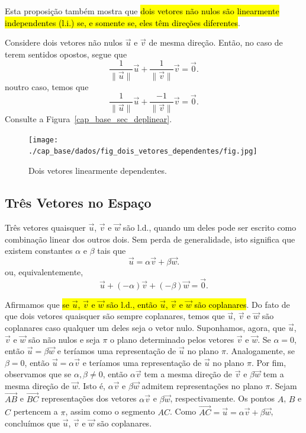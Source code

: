 Esta proposição também mostra que \hl{dois vetores não nulos são linearmente independentes (l.i.) se, e somente se, eles têm direções diferentes}.

\begin{ex}
  Considere dois vetores não nulos $\vec{u}$ e $\vec{v}$ de mesma direção. Então, no caso de terem sentidos opostos, segue que
  \begin{equation}
    \frac{1}{\|\vec{u}\|}\vec{u} + \frac{1}{\|\vec{v}\|}\vec{v} = \vec{0}.
  \end{equation}
  noutro caso, temos que
  \begin{equation}
    \frac{1}{\|\vec{u}\|}\vec{u} + \frac{-1}{\|\vec{v}\|}\vec{v} = \vec{0}.
  \end{equation}
  Consulte a Figura~\ref{cap_base_sec_deplinear}.

  \begin{figure}[h]
    \centering
    \texttt{[image: ./cap\_base/dados/fig\_dois\_vetores\_dependentes/fig.jpg]}
    \caption{Dois vetores linearmente dependentes.}
  \end{figure}
\end{ex}

\subsection{Três Vetores no Espaço}\label{cap_base_sec_deplinear_ssec_3vec}

Três vetores quaisquer $\vec{u}$, $\vec{v}$ e $\vec{w}$ são l.d., quando um deles pode ser escrito como combinação linear dos outros dois. Sem perda de generalidade, isto significa que existem constantes $\alpha$ e $\beta$ tais que
\begin{equation}
  \vec{u} = \alpha\vec{v} + \beta\vec{w}.
\end{equation}
ou, equivalentemente,
\begin{equation}
  \vec{u} + (-\alpha)\vec{v} + (-\beta)\vec{w} = \vec{0}.
\end{equation}

Afirmamos que \hl{se $\vec{u}$, $\vec{v}$ e $\vec{w}$ são l.d., então $\vec{u}$, $\vec{v}$ e $\vec{w}$ são coplanares}. Do fato de que dois vetores quaisquer são sempre coplanares, temos que $\vec{u}$, $\vec{v}$ e $\vec{w}$ são coplanares caso qualquer um deles seja o vetor nulo. Suponhamos, agora, que $\vec{u}$, $\vec{v}$ e $\vec{w}$ são não nulos e seja $\pi$ o plano determinado pelos vetores $\vec{v}$ e $\vec{w}$. Se $\alpha = 0$, então $\vec{u} = \beta\vec{w}$ e teríamos uma representação de $\vec{u}$ no plano $\pi$. Analogamente, se $\beta=0$, então $\vec{u} = \alpha\vec{v}$ e teríamos uma representação de $\vec{u}$ no plano $\pi$. Por fim, observamos que se $\alpha,\beta\neq 0$, então $\alpha\vec{v}$ tem a mesma direção de $\vec{v}$ e $\beta\vec{w}$ tem a mesma direção de $\vec{w}$. Isto é, $\alpha\vec{v}$ e $\beta\vec{w}$ admitem representações no plano $\pi$. Sejam $\overrightarrow{AB}$ e $\overrightarrow{BC}$ representações dos vetores $\alpha\vec{v}$ e $\beta\vec{w}$, respectivamente. Os pontos $A$, $B$ e $C$ pertencem a $\pi$, assim como o segmento $AC$. Como $\overrightarrow{AC} = \vec{u} = \alpha\vec{v} + \beta\vec{w}$, concluímos que $\vec{u}$, $\vec{v}$ e $\vec{w}$ são coplanares.

